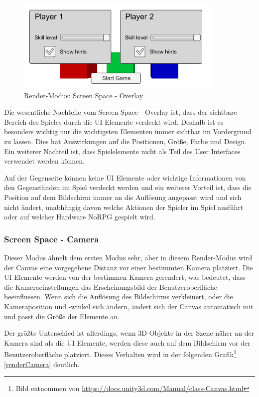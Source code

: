 			\begin{figure}[htbp]
				\centering 
				\label{renderOverlay}
				\includegraphics[width=10cm]{pics/CanvasOverlay.png}
				\caption{Render-Modus: Screen Space - Overlay}
			\end{figure}

			Die wesentliche Nachteile vom Screen Space - Overlay ist, dass der sichtbare Bereich des Spieles durch die \ac{UI} Elemente verdeckt wird. Deshalb ist es besonders wichtig nur die wichtigsten Elementen immer sichtbar im Vordergrund zu lassen. Dies hat Auswirkungen auf die Positionen, Größe, Farbe und Design. Ein weiterer Nachteil ist, dass Spielelemente nicht als Teil des User Interfaces verwendet werden können. 

			Auf der Gegenseite können keine \ac{UI} Elemente oder wichtige Informationen von den Gegenständen im Spiel verdeckt werden und ein weiterer Vorteil ist, dass die Position auf dem Bildschirm immer an die Auflösung angepasst wird und sich nicht ändert, unabhängig davon welche Aktionen der Spieler im Spiel ausführt oder auf welcher Hardware NoRPG gespielt wird.

		\subsubsection{Screen Space - Camera}
			Dieser Modus ähnelt dem ersten Modus sehr, aber in diesem Render-Modus wird der Canvas eine vorgegebene Distanz vor einer bestimmten Kamera platziert. Die \ac{UI} Elemente werden von der bestimmen Kamera gerendert, was bedeutet, dass die Kameraeinstellungen das Erscheinungsbild der Benutzeroberfläche beeinflussen. Wenn sich die Auflösung des Bildschirms verkleinert, oder die Kameraposition und -winkel sich ändern, ändert sich der Canvas automatisch mit und passt die Größe der Elemente an.

			Der größte Unterschied ist allerdings, wenn 3D-Objekte in der Szene näher an der Kamera sind als die \ac{UI} Elemente, werden diese auch auf dem Bildschirm vor der Benutzeroberfläche platziert. Dieses Verhalten wird in der folgenden Grafik\footnote{Bild entnommen von \url{https://docs.unity3d.com/Manual/class-Canvas.html}} \ref{renderCamera} deutlich.

